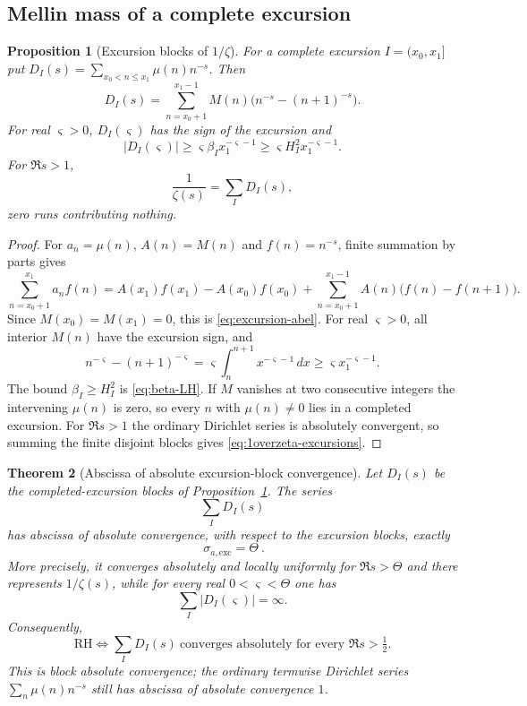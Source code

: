 \documentclass[11pt]{amsart}
\numberwithin{equation}{section}
\theoremstyle{plain}
\newtheorem{theorem}{Theorem}[section]
\newtheorem{proposition}[theorem]{Proposition}
\theoremstyle{definition}
\theoremstyle{remark}
\begin{document}
\subsection{Mellin mass of a complete excursion}

\begin{proposition}[Excursion blocks of $1/\zeta$]
\label{prop:excursion-mellin}
For a complete excursion $I=(x_0,x_1]$ put
$D_I(s)=\sum_{x_0<n\le x_1}\mu(n)n^{-s}$. Then
\begin{equation}
\label{eq:excursion-abel}
D_I(s)=\sum_{n=x_0+1}^{x_1-1}M(n)
\bigl(n^{-s}-(n+1)^{-s}\bigr).
\end{equation}
For real $\varsigma>0$, $D_I(\varsigma)$ has the sign of the excursion and
\begin{equation}
\label{eq:excursion-mass-lower}
|D_I(\varsigma)|\ge
\varsigma\beta_I x_1^{-\varsigma-1}
\ge\varsigma H_I^2x_1^{-\varsigma-1}.
\end{equation}
For $\Re s>1$,
\begin{equation}
\label{eq:1overzeta-excursions}
\frac1{\zeta(s)}=\sum_I D_I(s),
\end{equation}
zero runs contributing nothing.
\end{proposition}

\begin{proof}
For $a_n=\mu(n)$, $A(n)=M(n)$ and $f(n)=n^{-s}$, finite summation by
parts gives
\[
 \sum_{n=x_0+1}^{x_1}a_nf(n)
 =A(x_1)f(x_1)-A(x_0)f(x_0)
 +\sum_{n=x_0+1}^{x_1-1}A(n)\bigl(f(n)-f(n+1)\bigr).
\]
Since $M(x_0)=M(x_1)=0$, this is \eqref{eq:excursion-abel}.  For real
$\varsigma>0$, all interior $M(n)$ have the excursion sign, and
\[
 n^{-\varsigma}-(n+1)^{-\varsigma}
 =\varsigma\int_n^{n+1}x^{-\varsigma-1}\,dx
 \ge\varsigma x_1^{-\varsigma-1}.
\]
The bound $\beta_I\ge H_I^2$ is \eqref{eq:beta-LH}.  If $M$ vanishes at
two consecutive integers the intervening $\mu(n)$ is zero, so every
$n$ with $\mu(n)\ne0$ lies in a completed excursion.  For $\Re s>1$
the ordinary Dirichlet series is absolutely convergent, so summing the
finite disjoint blocks gives \eqref{eq:1overzeta-excursions}.
\end{proof}

\begin{theorem}[Abscissa of absolute excursion-block convergence]
\label{thm:excursion-block-abscissa}
Let $D_I(s)$ be the completed-excursion blocks of
Proposition~\ref{prop:excursion-mellin}.  The series
\[
 \sum_I D_I(s)
\]
has abscissa of absolute convergence, with respect to the excursion blocks,
exactly
\[
 \boxed{\ \sigma_{a,\mathrm{exc}}=\Theta\ }.
\]
More precisely, it converges absolutely and locally uniformly for
$\Re s>\Theta$ and there represents $1/\zeta(s)$, while for every real
$0<\varsigma<\Theta$ one has
\[
 \sum_I|D_I(\varsigma)|=\infty.
\]
Consequently,
\[
 \mathrm{RH}\iff
 \sum_I D_I(s)\ \text{converges absolutely for every }\Re s>\tfrac12.
\]
This is block absolute convergence; the ordinary termwise Dirichlet series
$\sum_n\mu(n)n^{-s}$ still has abscissa of absolute convergence $1$.
\end{theorem}
\end{document}

